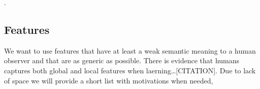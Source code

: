 . \normalsize

\begin{comment}
[We should maybe investigate if the penalization has the same effect on the eigenvalues as ridge regression ]
\end{comment}

\subsection{Features}\label{features}

We want to use features that have at least a weak semantic meaning to a
human observer and that are as generic as possible. There is evidence
that humans captures both global and local features when
laerning\ldots{}{[}CITATION{]}. Due to lack of space we will provide a
short list with motivations when needed,

